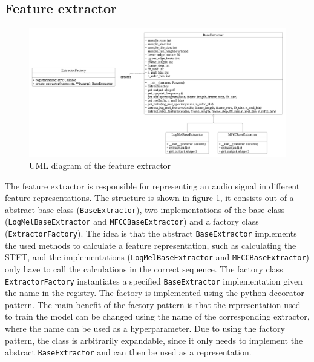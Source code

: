 \subsection{Feature extractor}
\label{sub:Component-Feature-Extractor}
\begin{figure}[htbp]
	\centering
	\includegraphics[width=\linewidth]{baa-documentation/img/UML_Feature_Extractor.jpeg}
	\caption{UML diagram of the \flqq feature extractor\frqq}
	\label{fig:UML-Feature-Extractor}
\end{figure}
\noindent
The feature extractor is responsible for representing an audio signal in different feature representations. The structure is shown in figure \ref{fig:UML-Feature-Extractor}, it consists out of a abstract base class (\texttt{BaseExtractor}), two implementations of the base class (\texttt{LogMelBaseExtractor} and \texttt{MFCCBaseExtractor}) and a factory class (\texttt{ExtractorFactory}). The idea is that the abstract \texttt{BaseExtractor} implements the used methods to calculate a feature representation, such as calculating the \gls{STFT}, and the implementations (\texttt{LogMelBaseExtractor} and \texttt{MFCCBaseExtractor}) only have to call the calculations in the correct sequence. The factory class \texttt{ExtractorFactory} instantiates a specified \texttt{BaseExtractor} implementation given the name in the registry. The factory is implemented using the python decorator pattern.
\newline
\newline
The main benefit of the factory pattern is that the representation used to train the model can be changed using the name of the corresponding extractor, where the name can be used as a hyperparameter. Due to using the factory pattern, the class is arbitrarily expandable, since it only needs to implement the abstract \texttt{BaseExtractor} and can then be used as a representation.

